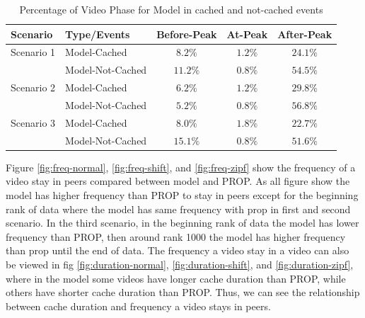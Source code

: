 \documentclass[10pt,final,journal,a4paper]{IEEEtran}
\begin{document}
\begin{table}[!t]
\caption{Percentage of Video Phase for Model in cached and not-cached events}
\label{tab:stacked2}
\centering
\begin{tabular}{|l|l|c|c|c|}
\hline
Scenario & Type/Events & Before-Peak & At-Peak & After-Peak\\
\hline
Scenario 1 & Model-Cached & $8.2\%$ & $1.2\%$ & $24.1\%$ \\
\hline
 & Model-Not-Cached & $11.2\%$ & $0.8\%$ & $54.5\%$ \\
 \hline

Scenario 2 & Model-Cached & $6.2\%$ & $1.2\%$ & $29.8\%$ \\
\hline
 & Model-Not-Cached & $5.2\%$ & $0.8\%$ & $56.8\%$ \\
\hline

Scenario 3 & Model-Cached & $8.0\%$ & $1.8\%$ & $22.7\%$ \\
\hline
 & Model-Not-Cached & $15.1\%$ & $0.8\%$ & $51.6\%$ \\
\hline
\end{tabular}
\end{table}

Figure \ref{fig:freq-normal}, \ref{fig:freq-shift}, and \ref{fig:freq-zipf} show the frequency of a video stay in peers compared between model and PROP.
As all figure show the model has higher frequency than PROP to stay in peers except for the beginning rank of data where the model has same frequency with prop in first and second scenario. 
In the third scenario, in the beginning rank of data the model has lower frequency than PROP, then around rank 1000 the model has higher frequency than prop until the end of data. 
The frequency a video stay in a video can also be viewed in fig \ref{fig:duration-normal},  \ref{fig:duration-shift}, and \ref{fig:duration-zipf}, where in the model some videos have longer cache duration than PROP, while others have shorter cache duration than PROP.  
Thus, we can see the relationship between cache duration and frequency a video stays in peers. 
\end{document}
